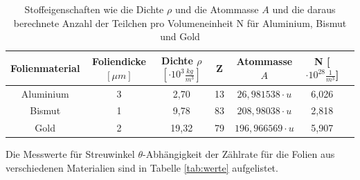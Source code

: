 \begin{table}[H]
\centering
\begin{tabular}{c|c c c c c c}

	Folienmaterial & Foliendicke $[\mu m]$&Dichte $\rho$ $[\cdot 10^3 \frac{kg}{m^3}]$ & Z & Atommasse $A$ & N [$\cdot 10^{28} \frac{1}{m^3}$] \\
	\hline
	Aluminium \cite{3} & 3 & 2,70 & 13 & $26,981538 \cdot u$ & 6,026 \\

	Bismut \cite{4} & 1 & 9,78 & 83 & $208,98038 \cdot u$ & 2,818 \\

	Gold \cite{5} & 2 & 19,32 & 79 & $196,966569 \cdot u$ & 5,907  \\

\end{tabular}
	\caption{Stoffeigenschaften wie die Dichte $\rho $ und die Atommasse $A$ und die daraus berechnete Anzahl der Teilchen pro Volumeneinheit N für Aluminium, Bismut und Gold }
	\label{tab:voldichte}
\end{table}
Die Messwerte für Streuwinkel $\theta$-Abhängigkeit der Zählrate für die Folien aus verschiedenen Materialien sind in Tabelle \ref{tab:werte} aufgelistet.

